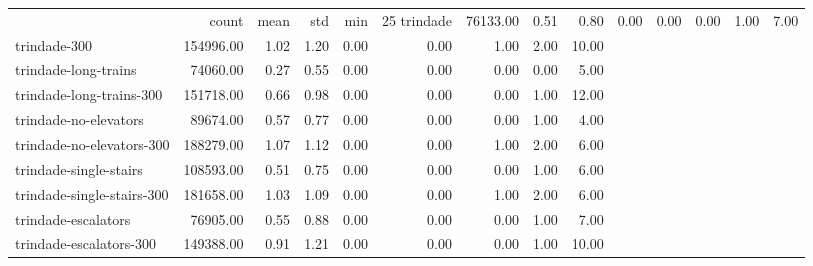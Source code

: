 \begin{tabular}{lrrrrrrrr}
 & count & mean & std & min & 25%
trindade & 76133.00 & 0.51 & 0.80 & 0.00 & 0.00 & 0.00 & 1.00 & 7.00 \\
trindade-300 & 154996.00 & 1.02 & 1.20 & 0.00 & 0.00 & 1.00 & 2.00 & 10.00 \\
trindade-long-trains & 74060.00 & 0.27 & 0.55 & 0.00 & 0.00 & 0.00 & 0.00 & 5.00 \\
trindade-long-trains-300 & 151718.00 & 0.66 & 0.98 & 0.00 & 0.00 & 0.00 & 1.00 & 12.00 \\
trindade-no-elevators & 89674.00 & 0.57 & 0.77 & 0.00 & 0.00 & 0.00 & 1.00 & 4.00 \\
trindade-no-elevators-300 & 188279.00 & 1.07 & 1.12 & 0.00 & 0.00 & 1.00 & 2.00 & 6.00 \\
trindade-single-stairs & 108593.00 & 0.51 & 0.75 & 0.00 & 0.00 & 0.00 & 1.00 & 6.00 \\
trindade-single-stairs-300 & 181658.00 & 1.03 & 1.09 & 0.00 & 0.00 & 1.00 & 2.00 & 6.00 \\
trindade-escalators & 76905.00 & 0.55 & 0.88 & 0.00 & 0.00 & 0.00 & 1.00 & 7.00 \\
trindade-escalators-300 & 149388.00 & 0.91 & 1.21 & 0.00 & 0.00 & 0.00 & 1.00 & 10.00 \\
\end{tabular}
